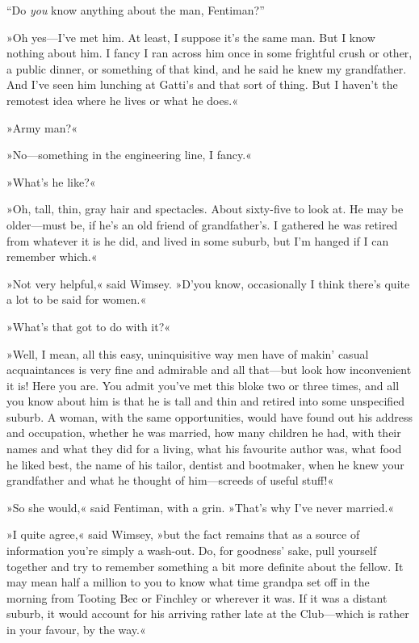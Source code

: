 \enquote{Do \textit{you} know anything about the man, Fentiman?}

»Oh yes\allowbreak---\allowbreak I've met him. At least, I suppose it's the same man. But I know nothing about him. I fancy I ran across him once in some frightful crush or other, a public dinner, or something of that kind, and he said he knew my grandfather. And I've seen him lunching at Gatti's and that sort of thing. But I haven't the remotest idea where he lives or what he does.«

»Army man?«

»No\allowbreak---\allowbreak something in the engineering line, I fancy.«

»What's he like?«

»Oh, tall, thin, gray hair and spectacles. About sixty-five to look at. He may be older\allowbreak---\allowbreak must be, if he's an old friend of grandfather's. I gathered he was retired from whatever it is he did, and lived in some suburb, but I'm hanged if I can remember which.«

»Not very helpful,« said Wimsey. »D'you know, occasionally I think there's quite a lot to be said for women.«

»What's that got to do with it?«

»Well, I mean, all this easy, uninquisitive way men have of makin' casual acquaintances is very fine and admirable and all that\allowbreak---\allowbreak but look how inconvenient it is! Here you are. You admit you've met this bloke two or three times, and all you know about him is that he is tall and thin and retired into some unspecified suburb. A woman, with the same opportunities, would have found out his address and occupation, whether he was married, how many children he had, with their names and what they did for a living, what his favourite author was, what food he liked best, the name of his tailor, dentist and bootmaker, when he knew your grandfather and what he thought of him\allowbreak---\allowbreak screeds of useful stuff!«

»So she would,« said Fentiman, with a grin. »That's why I've never married.«

»I quite agree,« said Wimsey, »but the fact remains that as a source of information you're simply a wash-out. Do, for goodness' sake, pull yourself together and try to remember something a bit more definite about the fellow. It may mean half a million to you to know what time grandpa set off in the morning from Tooting Bec or Finchley or wherever it was. If it was a distant suburb, it would account for his arriving rather late at the Club\allowbreak---\allowbreak which is rather in your favour, by the way.«

